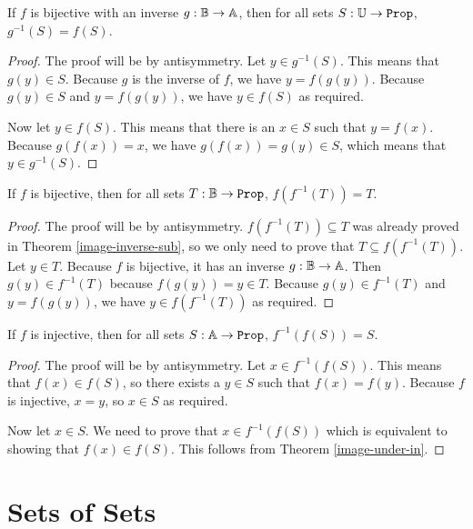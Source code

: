 \documentclass[../math.tex]{subfiles}
\begin{document}
\begin{theorem} \label{inverse-image-bij-inv}
    If $f$ is bijective with an inverse $g : \mathbb{B} \rightarrow \mathbb{A}$, then for all
    sets $S : \U \rightarrow \Prop$, $g^{-1}(S) = f(S)$.
\end{theorem}
\begin{proof}
    The proof will be by antisymmetry.  Let $y \in g^{-1}(S)$.  This means that
    $g(y) \in S$.  Because $g$ is the inverse of $f$, we have $y = f(g(y))$.
    Because $g(y) \in S$ and $y = f(g(y))$, we have $y \in f(S)$ as required.

    Now let $y \in f(S)$.  This means that there is an $x \in S$ such that $y =
    f(x)$.  Because $g(f(x)) = x$, we have $g(f(x)) = g(y) \in S$, which means
    that $y \in g^{-1}(S)$.
\end{proof}

\begin{theorem} \label{bij-inverse-image}
    If $f$ is bijective, then for all sets $T : \B \rightarrow \Prop$,
    $f(f^{-1}(T)) = T$.
\end{theorem}
\begin{proof}
    The proof will be by antisymmetry.  $f(f^{-1}(T)) \subseteq T$ was already
    proved in Theorem \ref{image-inverse-sub}, so we only need to prove that
    $T \subseteq f(f^{-1}(T))$.  Let $y \in T$.  Because $f$ is bijective, it
    has an inverse $g : \mathbb{B} \rightarrow \mathbb{A}$.  Then $g(y) \in f^{-1}(T)$ because
    $f(g(y)) = y \in T$.  Because $g(y) \in f^{-1}(T)$ and $y = f(g(y))$, we
    have $y \in f(f^{-1}(T))$ as required.
\end{proof}

\begin{theorem} \label{inj-inverse-image}
    If $f$ is injective, then for all sets $S : \A \rightarrow \Prop$,
    $f^{-1}(f(S)) = S$.
\end{theorem}
\begin{proof}
    The proof will be by antisymmetry.  Let $x \in f^{-1}(f(S))$.  This means
    that $f(x) \in f(S)$, so there exists a $y \in S$ such that $f(x) = f(y)$.
    Because $f$ is injective, $x = y$, so $x \in S$ as required.

    Now let $x \in S$.  We need to prove that $x \in f^{-1}(f(S))$ which is
    equivalent to showing that $f(x) \in f(S)$.  This follows from Theorem
    \ref{image-under-in}.
\end{proof}

\section{Sets of Sets}
\end{document}
